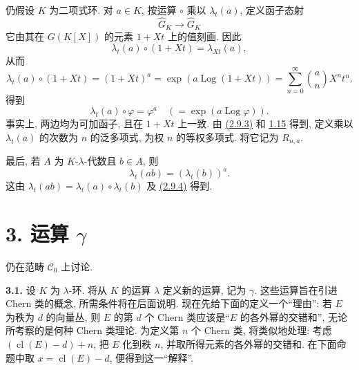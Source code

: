 \providecommand{\Ghat}{\widehat G}
\providecommand{\Gg}{\widehat G_g}
\providecommand{\Gcirc}{\widehat G_{\circ}}
\providecommand{\Gnabla}{\widehat G_{\nabla}}
\providecommand{\Grhat}{\widehat{\operatorname{Gr}}}
\providecommand{\Log}{\operatorname{Log}}
\providecommand{\Fil}{\operatorname{Fil}}
\providecommand{\eps}{\varepsilon}
\providecommand{\id}{\operatorname{id}}
\providecommand{\Sym}{\operatorname{Sym}}
\providecommand{\Mon}{\operatorname{Mon}}



仍假设 \(K\) 为二项式环. 对 \(a\in K\), 按运算 \(\circ\) 乘以 \(\lambda_t(a)\), 定义函子态射
\[
  \Ghat_K\longrightarrow \Ghat_K
\]
它由其在 \(G(K[X])\) 的元素 \(1+Xt\) 上的值刻画. 因此
\[
  \lambda_t(a)\circ(1+Xt)=\lambda_{Xt}(a),
\]
从而
\begin{equation}\tag{2.9.3}
  \lambda_t(a)\circ(1+Xt)
  =(1+Xt)^a
  =\exp(a\Log(1+Xt))
  =\sum_{n=0}^{\infty}\binom{a}{n}X^nt^n .
\end{equation}
得到
\begin{equation}\tag{2.9.4}
  \lambda_t(a)\circ\varphi=\varphi^a
  \quad(=\exp(a\Log\varphi)).
\end{equation}
事实上, 两边均为可加函子, 且在 \(1+Xt\) 上一致. 由 \hyperlink{sga6.e05.eq.2-9-3}{(2.9.3)} 和 \hyperlink{sga6.e05.para.1-15}{1.15} 得到, 定义乘以 \(\lambda_t(a)\) 的次数为 \(n\) 的泛多项式, 为权 \(n\) 的等权多项式. 将它记为 \(R_{n,a}\).

最后, 若 \(A\) 为 \(K\)-\(\lambda\)-代数且 \(b\in A\), 则
\begin{equation}\tag{2.9.5}
  \lambda_t(ab)=(\lambda_t(b))^a .
\end{equation}
这由 \(\lambda_t(ab)=\lambda_t(a)\circ\lambda_t(b)\) 及 \hyperlink{sga6.e05.eq.2-9-4}{(2.9.4)} 得到.

\section*{3. 运算 \(\gamma\)}

仍在范畴 \(\mathscr C_0\) 上讨论.

\textbf{3.1.} 设 \(K\) 为 \(\lambda\)-环. 将从 \(K\) 的运算 \(\lambda\) 定义新的运算, 记为 \(\gamma\). 这些运算旨在引进 Chern 类的概念, 所需条件将在后面说明. 现在先给下面的定义一个“理由”: 若 \(E\) 为秩为 \(d\) 的向量丛, 则 \(E\) 的第 \(d\) 个 Chern 类应该是“\(E\) 的各外幂的交错和”, 无论所考察的是何种 Chern 类理论. 为定义第 \(n\) 个 Chern 类, 将类似地处理: 考虑 \((\operatorname{cl}(E)-d)+n\), 把 \(E\) 化到秩 \(n\), 并取所得元素的各外幂的交错和. 在下面命题中取 \(x=\operatorname{cl}(E)-d\), 便得到这一“解释”.

